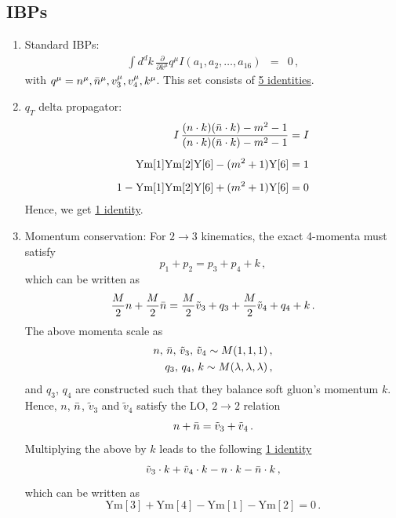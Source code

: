 \documentclass[a4paper,11pt]{report}
\numberwithin{equation}{section}
\begin{document}
\subsection{IBPs}

\begin{enumerate}
  \item
  Standard IBPs:
  \begin{eqnarray}
    \int d^dk\, \frac{\partial}{\partial k^\mu} q^\mu 
    I(a_1,a_2,\ldots, a_{16}) & = & 0\,,
  \end{eqnarray}
  with $q^\mu = n^\mu, \bar{n}^\mu, v_3^\mu, v_4^\mu, k^\mu$. This set
  consists of \underline{5 identities}.
  \item
  $q_T$ delta propagator:
  \begin{align}
  I\, \frac{(n\cdot k) (\bar{n}\cdot k) - m^2-1}
           {(n\cdot k) (\bar{n}\cdot k) - m^2-1} & = I
  \\[0.5em]
  \text{Ym}[1]\text{Ym}[2]\text{Y}[6] - (m^2+1)\text{Y}[6] & = 1
  \\[0.5em]
  1-\text{Ym}[1]\text{Ym}[2]\text{Y}[6] + (m^2+1)\text{Y}[6] & = 0
  \end{align}
  Hence, we get \underline{1 identity}.
  \item
  Momentum conservation: For $2 \to 3$ kinematics, the exact 4-momenta must
  satisfy
  \begin{equation}
    p_1 + p_2 = p_3 + p_4 + k\,,
  \end{equation}
  which can be written as
  \begin{equation}
   \frac{M}{2} n + \frac{M}{2} \bar{n}  = 
   \frac{M}{2} \tilde v_3 + q_3 + \frac{M}{2} \tilde v_4 + q_4 + k\,.
  \end{equation}
  The above momenta scale as
  \begin{eqnarray}
    n,\, \bar{n},\, \tilde v_3,\, \tilde v_4 \sim M (1,1,1)\,, \\
    q_3,\, q_4,\, k \sim M (\lambda, \lambda, \lambda)\,,
  \end{eqnarray}
  and $q_3$, $q_4$ are constructed such that they balance soft gluon's momentum
  $k$. Hence, $n$, $\bar{n}$, $\tilde v_3$ and $\tilde v_4$ satisfy the LO, $2\to
  2$ relation
  \begin{equation}
    n + \bar{n} = \tilde v_3 + \tilde v_4\,.
  \end{equation}
  Multiplying the above by $k$ leads to the following \underline{1 identity}
  \begin{equation}
    \tilde v_3\cdot k + \tilde v_4\cdot k - n\cdot k  - \bar{n}\cdot k\,,
  \end{equation}
  which can be written as
  \begin{equation}
    \text{Ym}[3] + \text{Ym}[4] - \text{Ym}[1] - \text{Ym}[2] = 0\,.
  \end{equation}
\end{enumerate}
\end{document}
